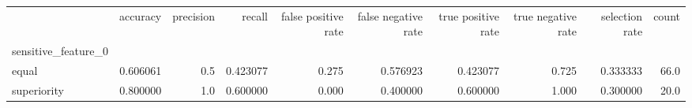 \begin{tabular}{lrrrrrrrrr}
\toprule
{} &  accuracy &  precision &    recall &  false positive rate &  false negative rate &  true positive rate &  true negative rate &  selection rate &  count \\
sensitive\_feature\_0 &           &            &           &                      &                      &                     &                     &                 &        \\
\midrule
equal               &  0.606061 &        0.5 &  0.423077 &                0.275 &             0.576923 &            0.423077 &               0.725 &        0.333333 &   66.0 \\
superiority         &  0.800000 &        1.0 &  0.600000 &                0.000 &             0.400000 &            0.600000 &               1.000 &        0.300000 &   20.0 \\
\bottomrule
\end{tabular}
